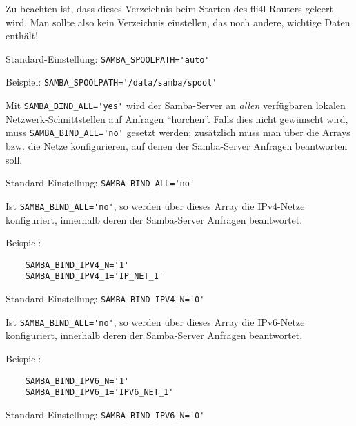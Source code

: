 \begin{description}
    Zu beachten ist, dass dieses Verzeichnis beim Starten des fli4l-Routers
    geleert wird. Man sollte also kein Verzeichnis einstellen, das noch andere,
    wichtige Daten enthält!

    Standard-Einstellung: \verb+SAMBA_SPOOLPATH='auto'+

    Beispiel: \verb+SAMBA_SPOOLPATH='/data/samba/spool'+


    Mit \verb+SAMBA_BIND_ALL='yes'+ wird der Samba-Server an \emph{allen}
    verfügbaren lokalen Netzwerk-Schnittstellen auf Anfragen ``horchen''. Falls
    dies nicht gewünscht wird, muss \verb+SAMBA_BIND_ALL='no'+ gesetzt werden;
    zusätzlich muss man über die Arrays  bzw.
     die Netze konfigurieren, auf denen der
    Samba-Server Anfragen beantworten soll.

    Standard-Einstellung: \verb+SAMBA_BIND_ALL='no'+


    Ist \verb+SAMBA_BIND_ALL='no'+, so werden über dieses Array die IPv4-Netze
    konfiguriert, innerhalb deren der Samba-Server Anfragen beantwortet.

    Beispiel:
\begin{example}
\begin{verbatim}
    SAMBA_BIND_IPV4_N='1'
    SAMBA_BIND_IPV4_1='IP_NET_1'
\end{verbatim}
\end{example}

    Standard-Einstellung: \verb+SAMBA_BIND_IPV4_N='0'+


    Ist \verb+SAMBA_BIND_ALL='no'+, so werden über dieses Array die IPv6-Netze
    konfiguriert, innerhalb deren der Samba-Server Anfragen beantwortet.

    Beispiel:
\begin{example}
\begin{verbatim}
    SAMBA_BIND_IPV6_N='1'
    SAMBA_BIND_IPV6_1='IPV6_NET_1'
\end{verbatim}
\end{example}

    Standard-Einstellung: \verb+SAMBA_BIND_IPV6_N='0'+


\end{description}
